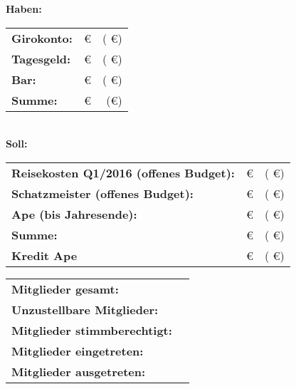 \begin{Protokoll}
\begin{description}
        \end{description}
    
        \begin{center}
            \textbf{Haben:} \\
            \begin{tabular}{|l||r|r|}
                \hline
                \textbf{Girokonto:}            & \euro         & (   \euro)     \\
                \textbf{Tagesgeld:}            &     \euro        & (   \euro)         \\ 
                \textbf{Bar:}                &     \euro     & (  \euro)         \\
                \hline
                \textbf{Summe:}                &     \euro     & (\euro)        \\
                \hline \hline
            \end{tabular} \\
            \vspace{.5em}
            \textbf{Soll:} \\
            \begin{tabular}{|l||r|r|}
                \hline
                \textbf{Reisekosten Q1/2016 (offenes Budget):}            
                &    \euro         & (   \euro)     \\
                \textbf{Schatzmeister (offenes Budget):}
                &       \euro            & ( \euro)         \\ 
                \textbf{Ape (bis Jahresende):}    
                &    \euro             & ( \euro)         \\
                \hline
                \textbf{Summe:}                &     \euro         & ( \euro)        \\
                \hline \hline
                \textbf{Kredit Ape}            &      \euro        & ( \euro) \\
                \hline
            \end{tabular}
        \end{center}
    
        \begin{center}
            \begin{tabular}{|l||r|}
                \hline
                \textbf{Mitglieder gesamt:}             &   \\
                \textbf{Unzustellbare Mitglieder:}      &  \\
                \textbf{Mitglieder stimmberechtigt:}    &    \\ 
                \textbf{Mitglieder eingetreten:}        &    \\
                \textbf{Mitglieder ausgetreten:}        &    \\
                \hline
            \end{tabular}
        \end{center}
    

\end{Protokoll}
